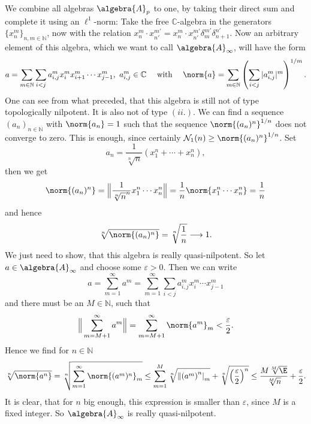 \documentclass[
11pt,                          %
english                        %
]{article}
\begin{document}
We combine all algebras $\algebra{A}_p$ to one, by taking their direct sum and 
complete it using an $\ell^1$-norm: Take the free $\mathbb{C}$-algebra in the 
generators $\{x_n^m\}_{n,m \in \mathbb{N}}$, now with the relation $x_n^m \cdot 
x_{n'}^{m'} = x_n^m \cdot x_{n'}^{m'} \delta_m^{m'} \delta_{n+1}^{n'}$. Now an 
arbitrary element of this algebra, which we want to call $\algebra{A}_\infty$, will 
have the form
\begin{equation*}
	a =
	\sum\limits_{m \in \mathbb{N}}
	\sum\limits_{i < j}
	a_{i, j}^m x_i^m x_{i + 1}^m \cdots x_{j - 1}^m
	, \
	a_{i,j}^m \in \mathbb{C}
	\quad \text{ with } \quad
	\norm{a}
	=
	\sum\limits_{m \in \mathbb{N}}
	\left(
		\sum\limits_{i < j}
		|a_{i, j}^m|^m
	\right)^{1/m}.
\end{equation*}
One can see from what preceded, that this algebra is still not of type topologically 
nilpotent. It is also not of type $(ii.)$. We can find a sequence $(a_n)_{n \in 
\mathbb{N}}$ with $\norm{ a_n } = 1$ such that the sequence $\norm{(a_n)^n}^{1/n}$ 
does not converge to zero. This is enough, since certainly $\mathcal{N}_1(n) \geq 
\norm{(a_n)^n}^{1/n}$. Set
\begin{equation*}
	a_n
	=
	\frac{1}{\sqrt[n]{n}}
	(x_1^n + \cdots + x_n^n),
\end{equation*}
then we get
\begin{equation*}
	\norm{(a_n)^n}
	=
	\Big\Vert
		\frac{1}{\sqrt[n]{n}^n}
		x_1^n \cdots x_n^n
	\Big\Vert
	=
	\frac{1}{n}
	\norm{ x_1^n \cdots x_n^n }
	=
	\frac{1}{n}
\end{equation*}
and hence
\begin{equation*}
	\sqrt[n]{ \norm{(a_n)^n} }
	=
	\sqrt[n]{\frac{1}{n}}
	\longrightarrow
	1.
\end{equation*}
We just need to show, that this algebra is really quasi-nilpotent. So let 
$a \in \algebra{A}_\infty$ and choose some $\varepsilon > 0$. Then we can write 
\begin{equation*}
	a 
	=
	\sum\limits_{m=1}^\infty
	a^m
	=
	\sum\limits_{m=1}^\infty
	\sum\limits_{i < j}
	a_{i, j}^m x_i^m \cdots x_{j-1}^m	
\end{equation*}
and there must be an $M \in \mathbb{N}$, such that
\begin{equation*}
	\Big\Vert
		\sum\limits_{m = M+1}^\infty
		a^m
	\Big\Vert
	=
	\sum\limits_{m = M+1}^\infty
	\norm{a^m}_m
	<
	\frac{\varepsilon}{2}.
\end{equation*}
Hence we find for $n \in \mathbb{N}$
\begin{equation*}
	\sqrt[n]{\norm{a^n}}
	=
	\sqrt[n]{
		\sum\limits_{m=1}^\infty
		\norm{(a^m)^n}_m
	}
	\leq
	\sum\limits_{m = 1}^M
	\sqrt[n]{
		\left\Vert \left( a^m \right)^n \right\vert_m
	}
	+
	\sqrt[n]{ \left( \frac{\varepsilon}{2} \right)^n }
	\leq
	\frac{M \sqrt[M]{\E}}
	{\sqrt[M]{n}}
	+ \frac{\varepsilon}{2}.
\end{equation*}
It is clear, that for $n$ big enough, this expression is smaller than $\varepsilon$, 
since $M$ is a fixed integer. So $\algebra{A}_\infty$ is really quasi-nilpotent.
\end{document}
